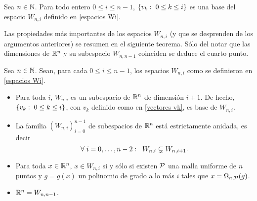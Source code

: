 \begin{cor}
Sea $n \in \mathbb{N}$. Para todo entero $0 \leq i \leq n-1$, 
$\{v_{k}: \hspace{0.1cm} 0\leq k \leq i \}$ es una base
del espacio $W_{n,i}$
definido en \eqref{espacios Wi}.
\end{cor}


Las propiedades más importantes de los
espacios $W_{n,i}$ (y que se desprenden
de los argumentos anteriores) se 
resumen en el siguiente teorema. 
Sólo del notar que las dimensiones de 
$\mathbb{R}^{n}$ y su subespacio $W_{n, n-1}$
coinciden se deduce el cuarto punto.


\begin{teo}
\label{cor: propiedades importantes de espacios Wi}
Sea $n \in \mathbb{N}$. Sean, para cada $0 \leq i \leq n-1$,
los espacios $W_{n,i}$ como
se definieron en \eqref{espacios Wi}.
\begin{itemize}
\item Para toda $i$, $W_{n,i}$ es un subespacio
de $\mathbb{R}^{n}$ de dimensión $i+1$. De hecho, 
$\{v_{k}: \hspace{0.1cm} 0\leq k \leq i \}$, con
$v_{k}$ definido como en \eqref{vectores vk},
es base de $W_{n,i}$.

\item La familia $(W_{n,i})_{i=0}^{n-1}$ de subespacios
	de $\mathbb{R}^{n}$ está estrictamente anidada, es decir
	\begin{equation}
	\label{espacios Wi estan anidados}
	\forall \hspace{0.1cm}
	i = 0, \ldots , n-2: \hspace{0.2cm}
	W_{n,i} \subsetneq W_{n,i+1}.
	\end{equation}

\item Para toda $x \in \mathbb{R}^{n}$, $x \in W_{n,i}$ si y sólo si
existen $\mathcal{P}$ una malla uniforme de $n$ puntos
y $g=g(x)$ un polinomio de grado a lo más $i$
tales que $x = \Omega_{n, \mathcal{P}}(g)$.

\item $\mathbb{R}^{n}= W_{n,n-1}$.
\end{itemize}
\end{teo}

